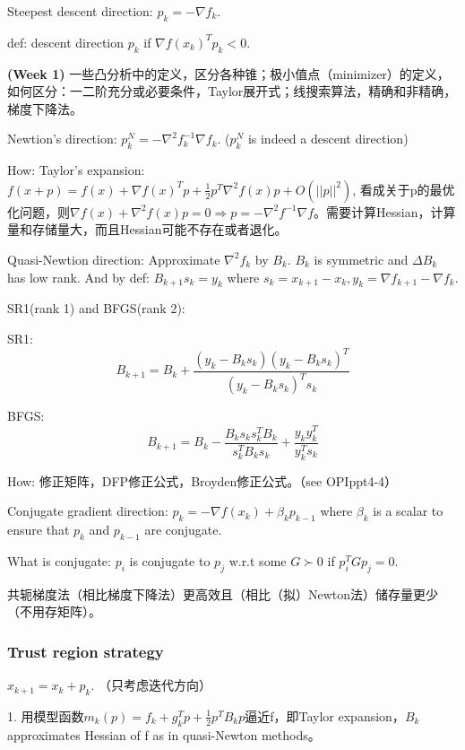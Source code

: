 Steepest descent direction: $p_k = - \nabla f_k$.

def: descent direction $p_k$ if $\nabla f(x_k)^{T} p_k < 0$.

\begin{conc}
  \textbf{(Week 1)} 一些凸分析中的定义，区分各种锥；极小值点（minimizer）的定义，如何区分：一二阶充分或必要条件，Taylor展开式；线搜索算法，精确和非精确，梯度下降法。
\end{conc}

Newtion's direction: $p_{k}^{N}=-\nabla^{2} f_{k}^{-1} \nabla f_{k}$. ($p_{k}^{N}$ is indeed a descent direction)

How: Taylor's expansion: $f(x+p)=f(x)+\nabla f(x)^{T} p+\frac{1}{2} p^{T} \nabla^{2} f(x) p + O(||p||^2)$, 看成关于p的最优化问题，则$\nabla f(x)+\nabla^{2} f(x) p = 0 \Rightarrow p = -\nabla^{2} f^{-1} \nabla f$。需要计算Hessian，计算量和存储量大，而且Hessian可能不存在或者退化。

Quasi-Newtion direction: Approximate $\nabla^{2} f_{k}$ by $B_{k}$. $B_{k}$ is symmetric and $\Delta B_{k}$ has low rank. And by def: $B_{k+1} s_{k}=y_{k}$ where $s_{k}=x_{k+1}-x_{k}, y_{k}=\nabla f_{k+1}-\nabla f_{k}$.

SR1(rank 1) and BFGS(rank 2):

SR1: 
\[
  B_{k+1}=B_{k}+\frac{\left(y_{k}-B_{k} s_{k}\right)\left(y_{k}-B_{k} s_{k}\right)^{T}}{\left(y_{k}-B_{k} s_{k}\right)^{T} s_{k}}
\]

BFGS:
\[
  B_{k+1}=B_{k}-\frac{B_{k} s_{k} s_{k}^{T} B_{k}}{s_{k}^{T} B_{k} s_{k}}+\frac{y_{k} y_{k}^{T}}{y_{k}^{T} s_{k}}
\]

How: 修正矩阵，DFP修正公式，Broyden修正公式。（see OPIppt4-4）

Conjugate gradient direction: $p_{k}=-\nabla f\left(x_{k}\right)+\beta_{k} p_{k-1}$ where $\beta_{k}$ is a scalar to ensure that $p_{k}$ and $p_{k-1}$ are conjugate.

What is conjugate: $p_i$ is conjugate to $p_j$ w.r.t some $G \succ 0$ if $p_i^T G p_j = 0$.

共轭梯度法（相比梯度下降法）更高效且（相比（拟）Newton法）储存量更少（不用存矩阵）。

\subsubsection{Trust region strategy}

$x_{k+1}=x_{k}+p_{k}$. （只考虑迭代方向）

1. 用模型函数$m_{k}(p)=f_{k}+g_{k}^{T} p+\frac{1}{2} p^{T} B_{k} p$逼近f，即Taylor expansion，$B_k$ approximates Hessian of f as in quasi-Newton methods。

